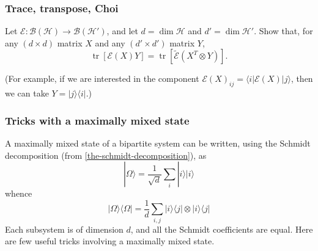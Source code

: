\documentclass[fleqn]{article}
\begin{document}
\hypertarget{trace-transpose-choi}{%
\subsubsection{Trace, transpose, Choi}\label{trace-transpose-choi}}

Let \(\mathcal{E}\colon\mathcal{B}(\mathcal{H})\to\mathcal{B}(\mathcal{H}')\), and let \(d=\dim\mathcal{H}\) and \(d'=\dim\mathcal{H}'\).
Show that, for any \((d\times d)\) matrix \(X\) and any \((d'\times d')\) matrix \(Y\),
\[
  \operatorname{tr}[\mathcal{E}(X)Y]
  = \operatorname{tr}[\widetilde{\mathcal{E}} (X^T\otimes Y)].
\]

(For example, if we are interested in the component \(\mathcal{E}(X)_{ij}=\langle i|\mathcal{E}(X)|j\rangle\), then we can take \(Y=|j\rangle\langle i|\).)

\hypertarget{tricks-with-a-maximally-mixed-state}{%
\subsubsection{Tricks with a maximally mixed state}\label{tricks-with-a-maximally-mixed-state}}

A maximally mixed state of a bipartite system can be written, using the Schmidt decomposition (from \ref{the-schmidt-decomposition}), as
\[
  |\Omega\rangle
  = \frac{1}{\sqrt d}\sum_i |i\rangle|i\rangle
\]
whence
\[
  |\Omega\rangle\langle\Omega|
  = \frac{1}{d} \sum_{i,j}|i\rangle\langle j|\otimes|i\rangle\langle j|
\]
Each subsystem is of dimension \(d\), and all the Schmidt coefficients are equal.
Here are few useful tricks involving a maximally mixed state.
\end{document}
